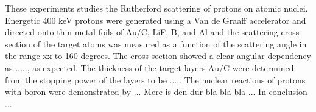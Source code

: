 These experiments studies the Rutherford scattering of protons on atomic nuclei. Energetic 400 keV protons were generated using a Van de Graaff accelerator and directed onto thin metal foils of Au/C, LiF, B, and Al and the scattering cross section of the target atoms was measured as a function of the scattering angle in the range xx to 160 degrees. The cross section showed a clear angular dependency as ....., as expected. 
The thickness of the target layers Au/C were determined from the stopping power of the layers to be ..... The nuclear reactions of protons with boron were demonstrated by ... 
Mere is den dur bla bla bla ... 
In conclusion ... 


